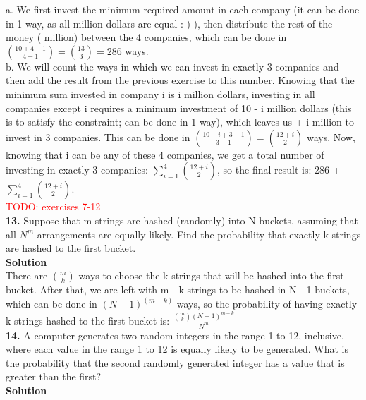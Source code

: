\documentclass[12pt,a4paper,oneside,draft]{report}
\newcommand\myworries[1]{\textcolor{red}{#1}}
\begin{document}
a. We first invest the minimum required amount in each company (it can be done in 1 way, as all million dollars are equal :-) ), then distribute the rest of the money ( million) between the 4 companies, which can be done in ${10 + 4 - 1 \choose 4 - 1} = {13 \choose 3 } = 286 $ ways. \\

b. We will count the ways in which we can invest in exactly 3 companies and then add the result from the previous exercise to this number. Knowing that the minimum sum invested in company i is \textdollar i million dollars, investing in all companies except i requires a minimum investment of 10 - i million dollars (this is to satisfy the constraint; can be done in 1 way), which leaves us  + i million to invest in 3 companies. This can be done in ${10 + i + 3 - 1 \choose 3 - 1} = {12 + i \choose 2}$ ways. Now, knowing that i can be any of these 4 companies, we get a total number of investing in exactly 3 companies: $\sum_{i = 1}^{4} {12 + i \choose 2}$, so the final result is: 286 + $\sum_{i = 1}^{4} {12 + i \choose 2}$. \\

\myworries{TODO: exercises 7-12} \\

\textbf{13.} Suppose that m strings are hashed (randomly) into N buckets, assuming that all $N^m$ arrangements are equally likely. Find the probability that exactly k strings are hashed to the first bucket. \\

\textbf{Solution} \\
There are $m \choose k$ ways to choose the k strings that will be hashed into the first bucket. After that, we are left with m - k strings to be hashed in N - 1 buckets, which can be done in $(N-1)^(m-k)$ ways, so the probability of having exactly k strings hashed to the first bucket is: $\frac{{m \choose k} {(N-1)^{m-k}} }{N^m}$ \\

\textbf{14.} A computer generates two random integers in the range 1 to 12, inclusive, where each value in the range 1 to 12 is equally likely to be generated. What is the probability that the second randomly generated integer has a value that is greater than the first? \\

\textbf{Solution} \\
\end{document}

